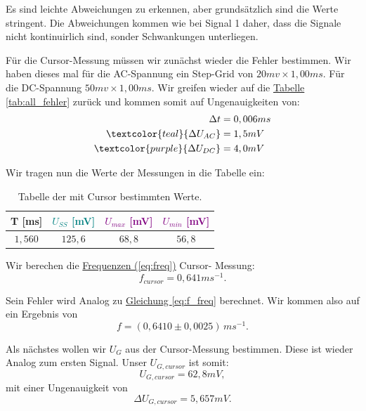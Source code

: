 Es sind leichte Abweichungen zu erkennen, aber grundsätzlich sind die Werte stringent. Die Abweichungen kommen wie bei Signal 1 daher, dass die Signale nicht kontinuirlich sind, sonder Schwankungen unterliegen. 

Für die Cursor-Messung müssen wir zunächst wieder die Fehler bestimmen. Wir haben dieses mal für die AC-Spannung ein Step-Grid von $20mv \times 1,00ms$. Für die DC-Spannung $50mv \times 1,00ms$. Wir greifen wieder auf die \hyperref[tab:all_fehler]{Tabelle \ref*{tab:all_fehler}} zurück und kommen somit auf Ungenauigkeiten von:
\begin{align}
    \Delta t &= 0,006 ms \\
    \textcolor{teal}{\Delta U_{AC}} &=1,5 mV \\
    \textcolor{purple}{\Delta U_{DC}} &= 4,0 mV
\end{align}

Wir tragen nun die Werte der Messungen in die Tabelle ein:
\begin{table}[h!]
    \centering
    \begin{tabular}{c | c | c | c }
        \toprule
        T [ms] & \textcolor{teal}{$U_{SS}$ [mV]} & \textcolor{purple}{$U_{max}$ [mV]} & \textcolor{purple}{$U_{min}$ [mV]} \\
        \hline
        $1,560$ & $125,6$ & $68,8$ & $56,8$ \\
        \bottomrule
    \end{tabular}
    \caption{Tabelle der mit Cursor bestimmten Werte. }
    \label{tab:sig2_cursor}
\end{table}

Wir berechen die \hyperref[eq:freq]{Frequenzen (\ref*{eq:freq})} Cursor- Messung:
\begin{equation}
    f_{cursor} = 0,641 ms^{-1}.
\end{equation}

Sein Fehler wird Analog zu \hyperref[eq:f_freq]{Gleichung \ref*{eq:f_freq}} berechnet. Wir kommen also auf ein Ergebnis von
\begin{equation}
\boxed{
    f = (0,6410 \pm 0,0025) \, ms^{-1}
}.
\end{equation}

Als nächstes wollen wir $U_G$ aus der Cursor-Messung bestimmen. Diese ist wieder Analog zum ersten Signal. 
Unser $U_{G,cursor}$ ist somit:
\begin{equation}
    U_{G,cursor} = 62,8 mV,
\end{equation}
mit einer Ungenauigkeit von
\begin{equation}
    \Delta U_{G,cursor} = 5,657 mV.
\end{equation}

